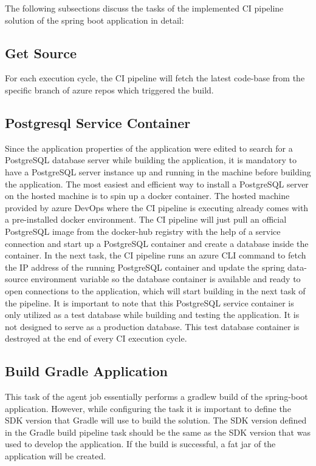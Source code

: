 The following subsections discuss the tasks of the implemented CI pipeline solution of the spring boot application in detail:

\subsection{Get Source}
For each execution cycle, the CI pipeline will fetch the latest code-base from the specific branch of azure repos which triggered the build. 

\subsection{Postgresql Service Container}
Since the application properties of the application were edited to search for a PostgreSQL database server while building the application, it is mandatory to have a PostgreSQL server instance up and running in the machine before building the application. The most easiest and efficient way to install a PostgreSQL server on the hosted machine is to spin up a docker container. The hosted machine provided by azure DevOps where the CI pipeline is executing already comes with a pre-installed docker environment. The CI pipeline will just pull an official PostgreSQL image from the docker-hub registry with the help of a service connection and start up a PostgreSQL container and create a database inside the container. In the next task, the CI pipeline runs an azure CLI command to fetch the IP address of the running PostgreSQL container and update the spring data-source environment variable so the database container is available and ready to open connections to the application, which will start building in the next task of the pipeline. It is important to note that this PostgreSQL service container is only utilized as a test database while building and testing the application. It is not designed to serve as a production database. This test database container is destroyed at the end of every CI execution cycle.

\subsection{Build Gradle Application}
This task of the agent job essentially performs a gradlew build of the spring-boot application. However, while configuring the task it is important to define the SDK version that Gradle will use to build the solution. The SDK version defined in the Gradle build pipeline task should be the same as the SDK version that was used to develop the application. If the build is successful, a fat jar of the application will be created.

